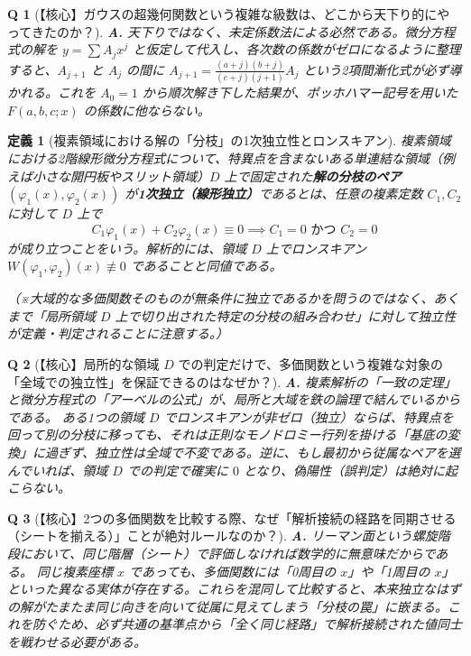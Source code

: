 \documentclass[paper=a4, fontsize=11pt]{jlreq} %
\theoremstyle{break}
\newtheorem{definition}[theorem]{定義}
\theoremstyle{qa}
\newtheorem*{Q}{Q}
\theoremstyle{remark} %
\begin{document}
\begin{Q}[【核心】ガウスの超幾何関数という複雑な級数は、どこから天下り的にやってきたのか？]
\textbf{A.} 天下りではなく、未定係数法による必然である。微分方程式の解を $y = \sum A_j x^j$ と仮定して代入し、各次数の係数がゼロになるように整理すると、$A_{j+1}$ と $A_j$ の間に $A_{j+1} = \frac{(a+j)(b+j)}{(c+j)(j+1)}A_j$ という2項間漸化式が必ず導かれる。これを $A_0 = 1$ から順次解き下した結果が、ポッホハマー記号を用いた $F(a,b,c;x)$ の係数に他ならない。
\end{Q}
\begin{definition}[複素領域における解の「分枝」の1次独立性とロンスキアン]\label{def:linear_independence_complex}
    複素領域における2階線形微分方程式について、特異点を含まないある単連結な領域（例えば小さな開円板やスリット領域）$D$ 上で固定された\textbf{解の分枝のペア $(\varphi_1(x), \varphi_2(x))$} が\textbf{1次独立（線形独立）}であるとは、任意の複素定数 $C_1, C_2$ に対して $D$ 上で
    \[ 
    C_1\varphi_1(x) + C_2\varphi_2(x) \equiv 0 \implies C_1 = 0 \text{ かつ } C_2 = 0 
    \]
    が成り立つことをいう。解析的には、領域 $D$ 上でロンスキアン $W(\varphi_1, \varphi_2)(x) \not\equiv 0$ であることと同値である。
    
    （※大域的な多価関数そのものが無条件に独立であるかを問うのではなく、あくまで「局所領域 $D$ 上で切り出された特定の分枝の組み合わせ」に対して独立性が定義・判定されることに注意する。）
\end{definition}

\begin{Q}[【核心】局所的な領域 $D$ での判定だけで、多価関数という複雑な対象の「全域での独立性」を保証できるのはなぜか？]
\textbf{A.} 複素解析の「一致の定理」と微分方程式の「アーベルの公式」が、局所と大域を鉄の論理で結んでいるからである。
ある1つの領域 $D$ でロンスキアンが非ゼロ（独立）ならば、特異点を回って別の分枝に移っても、それは正則なモノドロミー行列を掛ける「基底の変換」に過ぎず、独立性は全域で不変である。逆に、もし最初から従属なペアを選んでいれば、領域 $D$ での判定で確実に $0$ となり、偽陽性（誤判定）は絶対に起こらない。
\end{Q}

\begin{Q}[【核心】2つの多価関数を比較する際、なぜ「解析接続の経路を同期させる（シートを揃える）」ことが絶対ルールなのか？]
\textbf{A.} リーマン面という螺旋階段において、同じ階層（シート）で評価しなければ数学的に無意味だからである。
同じ複素座標 $x$ であっても、多価関数には「0周目の $x$」や「1周目の $x$」といった異なる実体が存在する。これらを混同して比較すると、本来独立なはずの解がたまたま同じ向きを向いて従属に見えてしまう「分枝の罠」に嵌まる。これを防ぐため、必ず共通の基準点から「全く同じ経路」で解析接続された値同士を戦わせる必要がある。
\end{Q}
\end{document}
